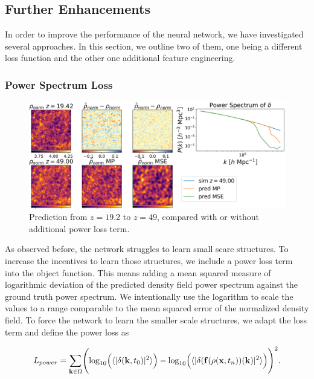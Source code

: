 \documentclass{article}
\begin{document}
\subsection{Further Enhancements}

In order to improve the performance of the neural network, we have investigated several approaches. In this section, we outline two of them, one being a different loss function and the other one additional feature engineering.

\subsubsection{Power Spectrum Loss}
\label{ps-loss}

\begin{figure}[h]
    \centering
    \includegraphics[width=0.95\linewidth]{img/compare_loss.png}
    \caption{Prediction from $z=19.2$ to $z=49$, compared with or without additional power loss term.}
    \label{fig:power-loss}
\end{figure}

As observed before, the network struggles to learn small scare structures. To increase the incentives to learn those structures, we include a power loss term into the object function. This means adding a mean squared measure of logarithmic deviation of the predicted density field power spectrum against the ground truth power spectrum. We intentionally use the logarithm to scale the values to a range comparable to the mean squared error of the normalized density field.
To force the network to learn the smaller scale structures, we adapt the loss term and define the power loss as

\begin{equation}
    L_{power} = \sum_{\mathbf{k} \in \Omega} \Biggl(  \log_{10} \Bigl( \langle |\delta(\mathbf{k}, t_0)|^2 \rangle \Bigr) - \log_{10} \Bigl( \langle |\delta(\mathbf{f}(\rho(\mathbf{x}, t_n))(\mathbf{k})|^2 \rangle \Bigr) \Biggr)^2.
\end{equation}
\end{document}
